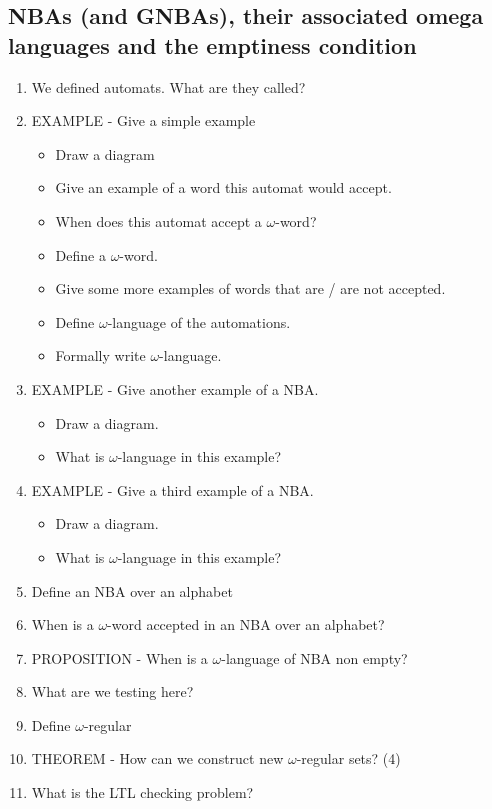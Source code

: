 \documentclass[fleqn]{article}
\begin{document}
\subsection{NBAs (and GNBAs), their associated omega languages and the emptiness condition}
\begin{enumerate}
    \item We defined automats. What are they called?
    \item EXAMPLE - Give a simple example
    \begin{itemize}
        \item Draw a diagram
        \item Give an example of a word this automat would accept.
        \item When does this automat accept a $\omega$-word?
        \item Define a $\omega$-word.
        \item Give some more examples of words that are / are not accepted.
        \item Define $\omega$-language of the automations.
        \item Formally write $\omega$-language.
        \end{itemize}
    \item EXAMPLE - Give another example of a NBA.
    \begin{itemize}
        \item Draw a diagram.
        \item What is $\omega$-language in this example?
    \end{itemize}
    \item EXAMPLE - Give a third example of a NBA.
    \begin{itemize}
        \item Draw a diagram.
        \item What is $\omega$-language in this example?
    \end{itemize}
    \item Define an NBA over an alphabet
    \item When is a $\omega$-word accepted in an NBA over an alphabet?
    \item PROPOSITION - When is a $\omega$-language of NBA non empty?
    \item What are we testing here?
    \item Define $\omega$-regular 
    \item THEOREM - How can we construct new $\omega$-regular sets? (4)
    \item What is the LTL checking problem?

\end{enumerate}
\end{document}
